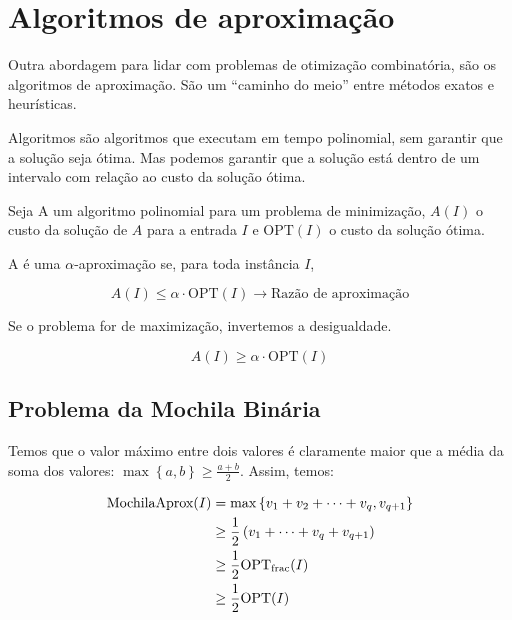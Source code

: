 \section{Algoritmos de aproximação}

Outra abordagem para lidar com problemas de otimização combinatória, são os algoritmos de aproximação. São um ``caminho do meio'' entre métodos exatos e heurísticas.

Algoritmos são algoritmos que executam em tempo polinomial, sem garantir que a solução seja ótima. Mas podemos garantir que a solução está dentro de um intervalo com relação ao custo da solução ótima.

Seja A um algoritmo polinomial para um problema de minimização, $A(I)$ o custo da solução de $A$ para a entrada $I$ e $\mathrm{OPT}(I)$ o custo da solução ótima.

A é uma $\alpha$-aproximação se, para toda instância $I$,

\[
	A(I) \leq \alpha \cdot \mathrm{OPT}(I) \rightarrow \text{Razão de aproximação}
\]

Se o problema for de maximização, invertemos a desigualdade.

\[
	A(I) \geq \alpha\cdot \mathrm{OPT}(I)
\]

\subsection{Problema da Mochila Binária}

\begin{algorithm}
	\SetAlgoLined
\end{algorithm}

Temos que o valor máximo entre dois valores é claramente maior que a média da soma dos valores: $\max\left\{ a, b\right\} \geq \frac{a+b}{2}$. Assim, temos:

\begin{align*}
	\text{\lstinline{MochilaAprox}}(I) &= \max\left\{ v_1 + v_2 + \dots + v_q, v_{q+1}\right\} \\
	  & \geq \frac{1}{2}\left( v_1 + \dots + v_q + v_{q+1} \right) \\
	  & \geq \frac{1}{2}\mathrm{OPT}_{\mathrm{frac}}(I)            \\
	  & \geq \frac{1}{2}\mathrm{OPT}(I)
\end{align*}

